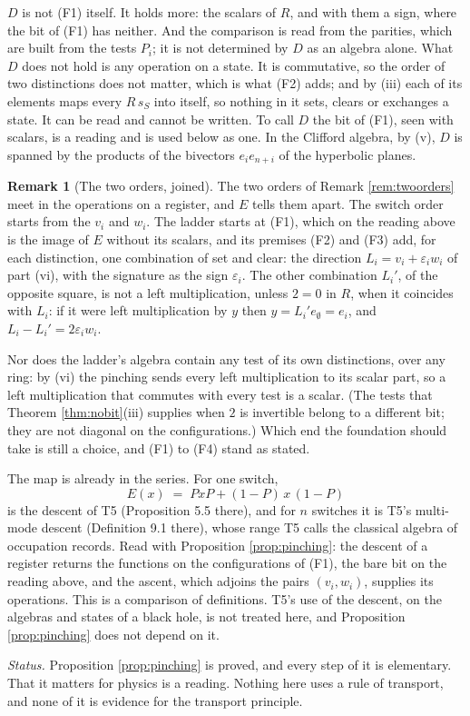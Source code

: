 \documentclass[11pt]{article}
\theoremstyle{plain}
\theoremstyle{definition}
\theoremstyle{plain}
\theoremstyle{definition}
\newtheorem{remark}[theorem]{Remark}
\begin{document}
$D$ is not (F1) itself. It holds more: the scalars of $R$, and with them a sign, where the bit of (F1) has neither. And the comparison is read from the parities, which are built from the tests $P_{i}$; it is not determined by $D$ as an algebra alone. What $D$ does not hold is any operation on a state. It is commutative, so the order of two distinctions does not matter, which is what (F2) adds; and by (iii) each of its elements maps every $R\,s_{S}$ into itself, so nothing in it sets, clears or exchanges a state. It can be read and cannot be written. To call $D$ the bit of (F1), seen with scalars, is a reading and is used below as one. In the Clifford algebra, by (v), $D$ is spanned by the products of the bivectors $e_{i}e_{n+i}$ of the hyperbolic planes.

\begin{remark}[The two orders, joined]\label{rem:joined}
The two orders of Remark \ref{rem:twoorders} meet in the operations on a register, and $E$ tells them apart. The switch order starts from the $v_{i}$ and $w_{i}$. The ladder starts at (F1), which on the reading above is the image of $E$ without its scalars, and its premises (F2) and (F3) add, for each distinction, one combination of set and clear: the direction $L_{i} = v_{i} + \varepsilon_{i}w_{i}$ of part (vi), with the signature as the sign $\varepsilon_{i}$. The other combination $L_{i}'$, of the opposite square, is not a left multiplication, unless $2 = 0$ in $R$, when it coincides with $L_{i}$: if it were left multiplication by $y$ then $y = L_{i}'e_{\emptyset} = e_{i}$, and $L_{i} - L_{i}' = 2\varepsilon_{i}w_{i}$.

Nor does the ladder's algebra contain any test of its own distinctions, over any ring: by (vi) the pinching sends every left multiplication to its scalar part, so a left multiplication that commutes with every test is a scalar. (The tests that Theorem \ref{thm:nobit}(iii) supplies when $2$ is invertible belong to a different bit; they are not diagonal on the configurations.) Which end the foundation should take is still a choice, and (F1) to (F4) stand as stated.

The map is already in the series. For one switch,
\[
E(x) \;=\; PxP + (1-P)\,x\,(1-P)
\]
is the descent of T5 \cite{ButlerT5} (Proposition 5.5 there), and for $n$ switches it is T5's multi-mode descent (Definition 9.1 there), whose range T5 calls the classical algebra of occupation records. Read with Proposition \ref{prop:pinching}: the descent of a register returns the functions on the configurations of (F1), the bare bit on the reading above, and the ascent, which adjoins the pairs $(v_{i}, w_{i})$, supplies its operations. This is a comparison of definitions. T5's use of the descent, on the algebras and states of a black hole, is not treated here, and Proposition \ref{prop:pinching} does not depend on it.

\emph{Status.} Proposition \ref{prop:pinching} is proved, and every step of it is elementary. That it matters for physics is a reading. Nothing here uses a rule of transport, and none of it is evidence for the transport principle.
\end{remark}
\end{document}
